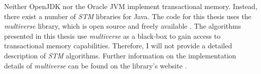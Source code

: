 Neither OpenJDK nor the Oracle JVM implement transactional memory. Instead,
there exist a number of \emph{STM} libraries for Java. The code for this thesis
uses the \emph{multiverse} library, which is open source and freely available
\cite{MultiverseWebsite}. The algorithms presented in this thesis use
\emph{multiverse} as a black-box to gain access to transactional memory
capabilities. Therefore, I will not provide a detailed description of \emph{STM}
algorithms. Further information on the implementation details of
\emph{multiverse} can be found on the library's website
\cite{MultiverseWebsite}.

